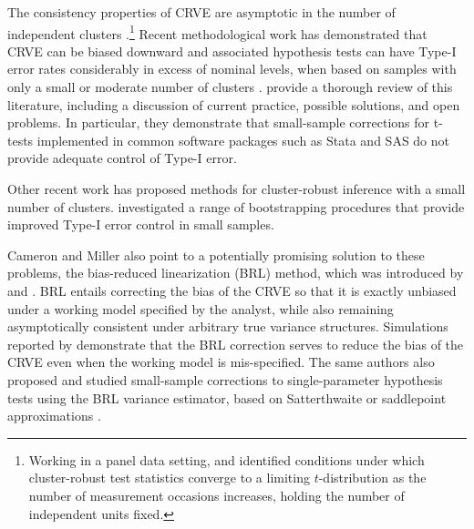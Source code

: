 \documentclass[12pt]{article}\usepackage[]{graphicx}\usepackage[]{color}
\begin{document}
The consistency properties of CRVE are asymptotic in the number of independent clusters \citep{Wooldridge2003cluster}.\footnote{Working in a panel data setting, \citet{Hansen2007asymptotic} and \citet{Donald2007inference} identified conditions under which cluster-robust test statistics converge to a limiting $t$-distribution as the number of measurement occasions increases, holding the number of independent units fixed.}
Recent methodological work has demonstrated that CRVE can be biased downward and associated hypothesis tests can have Type-I error rates considerably in excess of nominal levels, when based on samples with only a small or moderate number of clusters \citep[e.g.,][]{Webb2013wild}.
\citet{Cameron2015practitioners} provide a thorough review of this literature, including a discussion of current practice, possible solutions, and open problems. 
In particular, they demonstrate that small-sample corrections for t-tests implemented in common software packages such as Stata and SAS do not provide adequate control of Type-I error. 

Other recent work has proposed methods for cluster-robust inference with a small number of clusters. \citet{Cameron2008bootstrap} investigated a range of bootstrapping procedures that provide improved Type-I error control in small samples. 

\citet{Ibragimov2010tstatistic} 
\citet{Carter2013asymptotic}
\citet{Conley2011inference}

Cameron and Miller also point to a potentially promising solution to these problems, the bias-reduced linearization (BRL) method, which was introduced by \citet{McCaffrey2001generalizations} and \citet{Bell2002bias}. 
BRL entails correcting the bias of the CRVE so that it is exactly unbiased under a working model specified by the analyst, while also remaining asymptotically consistent under arbitrary true variance structures. 
Simulations reported by \citet{Bell2002bias} demonstrate that the BRL correction serves to reduce the bias of the CRVE even when the working model is mis-specified. 
The same authors also proposed and studied small-sample corrections to single-parameter hypothesis tests using the BRL variance estimator, based on Satterthwaite \citep{Bell2002bias} or saddlepoint approximations \citep{McCaffrey2006improved}.
\end{document}
